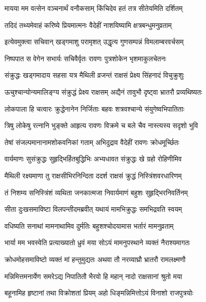 \twolineshloka
{मायया मम वत्सेन वञ्चनार्थं वनौकसाम्}
{किंचिदेव हतं तत्र सीतेयमिति दर्शितम्} %

\twolineshloka
{तदिदं तथ्यमेवाहं करिष्ये प्रियमात्मनः}
{वैदेहीं नाशयिष्यामि क्षत्रबन्धुमनुव्रताम्} %

\twolineshloka
{इत्येवमुक्त्वा सचिवान् खड्गमाशु परामृशत्}
{उद्धृत्य गुणसम्पन्नं विमलाम्बरवर्चसम्} %

\twolineshloka
{निष्पपात स वेगेन सभार्यः सचिवैर्वृतः}
{रावणः पुत्रशोकेन भृशमाकुलचेतनः} %

\twolineshloka
{संक्रुद्धः खड्गमादाय सहसा यत्र मैथिली}
{व्रजन्तं राक्षसं प्रेक्ष्य सिंहनादं विचुक्रुशुः} %

\twolineshloka
{ऊचुश्चान्योन्यमालिङ्ग्य संक्रुद्धं प्रेक्ष्य राक्षसम्}
{अद्यैनं तावुभौ दृष्ट्वा भ्रातरौ प्रव्यथिष्यतः} %

\twolineshloka
{लोकपाला हि चत्वारः क्रुद्धेनानेन निर्जिताः}
{बहवः शत्रवश्चान्ये संयुगेष्वभिपातिताः} %

\twolineshloka
{त्रिषु लोकेषु रत्नानि भुङ्क्ते आहृत्य रावणः}
{विक्रमे च बले चैव नास्त्यस्य सदृशो भुवि} %

\twolineshloka
{तेषां संजल्पमानानामशोकवनिकां गताम्}
{अभिदुद्राव वैदेहीं रावणः क्रोधमूर्च्छितः} %

\twolineshloka
{वार्यमाणः सुसंक्रुद्धः सुहृद्भिर्हितबुद्धिभिः}
{अभ्यधावत संक्रुद्धः खे ग्रहो रोहिणीमिव} %

\twolineshloka
{मैथिली रक्ष्यमाणा तु राक्षसीभिरनिन्दिता}
{ददर्श राक्षसं क्रुद्धं निस्त्रिंशवरधारिणम्} %

\twolineshloka
{तं निशम्य सनिस्त्रिंशं व्यथिता जनकात्मजा}
{निवार्यमाणं बहुशः सुहृद्भिरनिवर्तिनम्} %

\twolineshloka
{सीता दुःखसमाविष्टा विलपन्तीदमब्रवीत्}
{यथायं मामभिक्रुद्धः समभिद्रवति स्वयम्} %

\twolineshloka
{वधिष्यति सनाथां मामनाथामिव दुर्मतिः}
{बहुशश्चोदयामास भर्तारं मामनुव्रताम्} %

\twolineshloka
{भार्या मम भवस्वेति प्रत्याख्यातो ध्रुवं मया}
{सोऽयं मामनुपस्थाने व्यक्तं नैराश्यमागतः} %

\twolineshloka
{क्रोधमोहसमाविष्टो व्यक्तं मां हन्तुमुद्यतः}
{अथवा तौ नरव्याघ्रौ भ्रातरौ रामलक्ष्मणौ} %

\twolineshloka
{मन्निमित्तमनार्येण समरेऽद्य निपातितौ}
{भैरवो हि महान् नादो राक्षसानां श्रुतो मया} %

\twolineshloka
{बहूनामिह हृष्टानां तथा विक्रोशतां प्रियम्}
{अहो धिङ्मन्निमित्तोऽयं विनाशो राजपुत्रयोः} %

